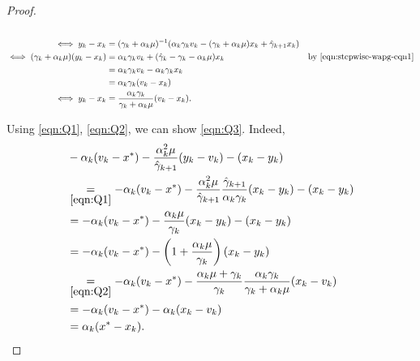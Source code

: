 \documentclass[12pt]{article}
\begin{document}
\begin{proof}
\begin{align*}
            \\
            \iff
            y_k - x_k &=
            (\gamma_k + \alpha_k \mu)^{-1}
            (\alpha_k \gamma_k v_k - (\gamma_k + \alpha_k \mu)x_k + \hat \gamma_{k + 1} x_k)
            \\
            \iff
            (\gamma_k + \alpha_k \mu)(y_k - x_k)
            &=
            \alpha_k\gamma _kv_k +
            (\hat \gamma_k - \gamma_k - \alpha_k \mu) x_k
            & \text{by \eqref{eqn:stepwise-wapg-eqn1}}
            \\
            &= \alpha_k \gamma_k v_k - \alpha_k \gamma_k x_k
            \\
            &= \alpha_k \gamma_k(v_k - x_k)
            \\
            \iff
            y_k - x_k &=
            \frac{\alpha_k \gamma_k}{\gamma_k + \alpha_k \mu}(v_k - x_k).
        \end{align*}
        \par
        Using \eqref{eqn:Q1}, \eqref{eqn:Q2}, we can show \eqref{eqn:Q3}.
        Indeed,
        \begin{align*}
            &
            - \alpha_k(v_k - x^*) - \frac{\alpha_k^2 \mu}{\hat \gamma_{k + 1}}(y_k - v_k) - (x_k - y_k)
            \\
            & \underset{\eqref{eqn:Q1}}{=}
            -\alpha_k(v_k - x^*) -
            \frac{\alpha_k^2\mu}{\hat \gamma_{k + 1}}
            \frac{\hat \gamma_{k + 1}}{\alpha_k \gamma_k}(x_k - y_k)
            - (x_k - y_k)
            \\
            &=
            -\alpha_k(v_k - x^*) -
            \frac{\alpha_k \mu}{\gamma_k}(x_k - y_k)
            - (x_k - y_k)
            \\
            &=
            -\alpha_k(v_k - x^*) -
            \left(
                1 + \frac{\alpha_k \mu}{\gamma_k}
            \right)(x_k - y_k)
            \\
            &\underset{\eqref{eqn:Q2}}{=}
            -\alpha_k(v_k - x^*) -
            \frac{\alpha_k \mu + \gamma_k}{\gamma_k}
            \frac{\alpha_k \gamma_k}{\gamma_k + \alpha_k \mu}(x_k - v_k)
            \\
            &=
            -\alpha_k(v_k - x^*)
            - \alpha_k(x_k - v_k)
            \\
            &= \alpha_k(x^* - x_k).
        \end{align*}
    \end{proof}
    
\end{document}
